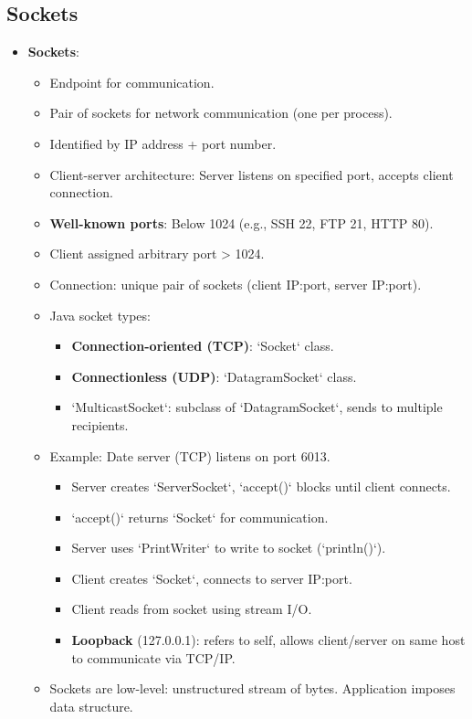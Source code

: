 \subsection{Sockets}
\begin{itemize}
    \item \textbf{Sockets}:
        \begin{itemize}
            \item Endpoint for communication.
            \item Pair of sockets for network communication (one per process).
            \item Identified by IP address + port number.
            \item Client-server architecture: Server listens on specified port, accepts client connection.
            \item \textbf{Well-known ports}: Below 1024 (e.g., SSH 22, FTP 21, HTTP 80).
            \item Client assigned arbitrary port > 1024.
            \item Connection: unique pair of sockets (client IP:port, server IP:port).
            \item Java socket types:
                \begin{itemize}
                    \item \textbf{Connection-oriented (TCP)}: `Socket` class.
                    \item \textbf{Connectionless (UDP)}: `DatagramSocket` class.
                    \item `MulticastSocket`: subclass of `DatagramSocket`, sends to multiple recipients.
                \end{itemize}
            \item Example: Date server (TCP) listens on port 6013.
                \begin{itemize}
                    \item Server creates `ServerSocket`, `accept()` blocks until client connects.
                    \item `accept()` returns `Socket` for communication.
                    \item Server uses `PrintWriter` to write to socket (`println()`).
                    \item Client creates `Socket`, connects to server IP:port.
                    \item Client reads from socket using stream I/O.
                    \item \textbf{Loopback} (127.0.0.1): refers to self, allows client/server on same host to communicate via TCP/IP.
                \end{itemize}
            \item Sockets are low-level: unstructured stream of bytes. Application imposes data structure.
        \end{itemize}
\end{itemize}

